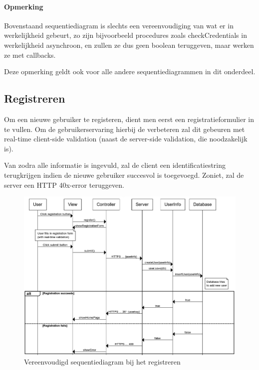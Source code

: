 \documentclass{article}
\begin{document}
\paragraph{Opmerking}

Bovenstaand sequentiediagram is slechts een vereenvoudiging van wat er in werkelijkheid gebeurt, zo zijn bijvoorbeeld procedures zoals checkCredentials in werkelijkheid asynchroon, en zullen ze dus geen boolean teruggeven, maar werken ze met callbacks.

Deze opmerking geldt ook voor alle andere sequentiediagrammen in dit onderdeel.

\subsection{Registreren}

Om een nieuwe gebruiker te registeren, dient men eerst een registratieformulier in te vullen. Om de gebruikerservaring hierbij de verbeteren zal dit gebeuren met real-time client-side validation (naast de server-side validation, die noodzakelijk is). 

Van zodra alle informatie is ingevuld, zal de client een identificatiestring terugkrijgen indien de nieuwe gebruiker succesvol is toegevoegd. Zoniet, zal de server een HTTP 40x-error teruggeven.

\begin{figure}[!h]
\centering
 \includegraphics[width=145mm]{registration-sequence.png}
 \caption{Vereenvoudigd sequentiediagram bij het registreren}
 \label{register-sequence}
\end{figure}
\end{document}
